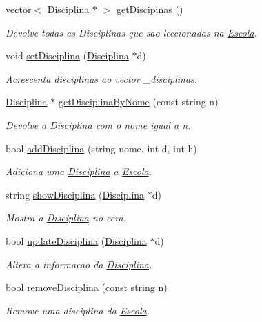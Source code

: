 \begin{DoxyCompactItemize}
vector$<$ \hyperlink{class_disciplina}{Disciplina} $\ast$ $>$ \hyperlink{class_escola_a733893af8f3535eebe4624525945589d}{get\-Discipinas} ()
\begin{DoxyCompactList}\small\item\em Devolve todas as Disciplinas que sao leccionadas na \hyperlink{class_escola}{Escola}. \end{DoxyCompactList}\item 
void \hyperlink{class_escola_ac117e7e2d2f9c2ef22b41b6dc7a96708}{set\-Disciplina} (\hyperlink{class_disciplina}{Disciplina} $\ast$d)
\begin{DoxyCompactList}\small\item\em Acrescenta disciplinas ao vector \-\_\-disciplinas. \end{DoxyCompactList}\item 
\hyperlink{class_disciplina}{Disciplina} $\ast$ \hyperlink{class_escola_a75b1f1a614ca1163cf2c53f25331b939}{get\-Disciplina\-By\-Nome} (const string n)
\begin{DoxyCompactList}\small\item\em Devolve a \hyperlink{class_disciplina}{Disciplina} com o nome igual a n. \end{DoxyCompactList}\item 
bool \hyperlink{class_escola_ad60836279a3f0a7d974a49b950aabda0}{add\-Disciplina} (string nome, int d, int h)
\begin{DoxyCompactList}\small\item\em Adiciona uma \hyperlink{class_disciplina}{Disciplina} a \hyperlink{class_escola}{Escola}. \end{DoxyCompactList}\item 
string \hyperlink{class_escola_a3578c85887dd28c9d0b6f7c7f10f3020}{show\-Disciplina} (\hyperlink{class_disciplina}{Disciplina} $\ast$d)
\begin{DoxyCompactList}\small\item\em Mostra a \hyperlink{class_disciplina}{Disciplina} no ecra. \end{DoxyCompactList}\item 
bool \hyperlink{class_escola_a3e5bd122514b59138e8fac07ca63e23a}{update\-Disciplina} (\hyperlink{class_disciplina}{Disciplina} $\ast$d)
\begin{DoxyCompactList}\small\item\em Altera a informacao da \hyperlink{class_disciplina}{Disciplina}. \end{DoxyCompactList}\item 
bool \hyperlink{class_escola_a2e726efed10bae8f782f2f5370ec9f44}{remove\-Disciplina} (const string n)
\begin{DoxyCompactList}\small\item\em Remove uma disciplina da \hyperlink{class_escola}{Escola}. \end{DoxyCompactList}\end{DoxyCompactItemize}


